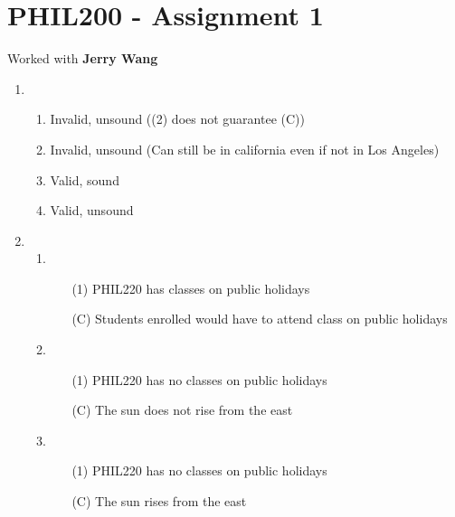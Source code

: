 \documentclass{article}
\begin{document}
\section*{PHIL200 - Assignment 1}

Worked with \textbf{Jerry Wang}

\begin{enumerate}[label=\arabic*.]
    \item \begin{enumerate}[label=\arabic*.]
              \item Invalid, unsound ((2) does not guarantee (C))
              \item Invalid, unsound (Can still be in california even if not in Los Angeles)
              \item Valid, sound
              \item Valid, unsound
          \end{enumerate}
    \item \begin{enumerate}[start=5, label=\arabic*.]
              \item \begin{itemize}
                        \item[(1)] PHIL220 has classes on public holidays
                        \item[(C)] Students enrolled would have to attend class on public holidays
                    \end{itemize}
              \item \begin{itemize}
                        \item[(1)] PHIL220 has no classes on public holidays
                        \item[(C)] The sun does not rise from the east
                    \end{itemize}
              \item \begin{itemize}
                        \item[(1)] PHIL220 has no classes on public holidays
                        \item[(C)] The sun rises from the east
                    \end{itemize}
          \end{enumerate}
\end{enumerate}
\end{document}
